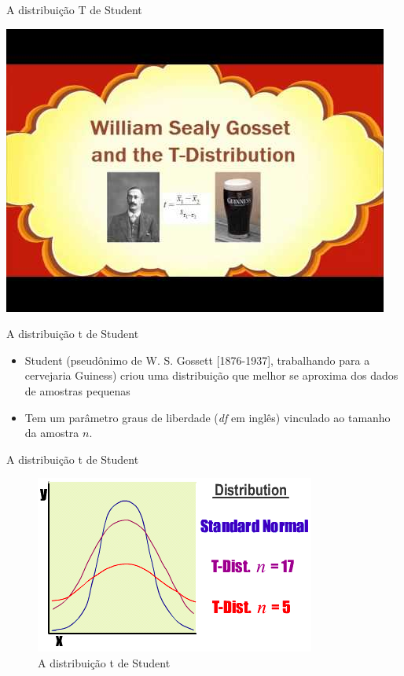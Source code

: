 \documentclass{beamer}
\begin{document}
\begin{frame}{A distribuição T de Student}
  \begin{center}
    \includegraphics[height=\textheight]{Cap5/Student-Guinness}
  \end{center}
\end{frame}

\begin{frame}{A distribuição t de Student}
  \begin{itemize}
  \item Student (pseudônimo de W. S. Gossett [1876-1937], trabalhando
    para a cervejaria Guiness) criou uma distribuição que melhor se
    aproxima dos dados de amostras pequenas
  \item Tem um parâmetro \alert{graus de liberdade} ({\em df} em inglês) vinculado ao tamanho da amostra $n$.
  \end{itemize}
\end{frame}

\begin{frame}{A distribuição t de Student}
  \begin{figure}
    \includegraphics[height=0.7\textheight]{Inf_II/t_graph}
    \caption{A distribuição t de Student}
  \end{figure}
\end{frame}
\end{document}
